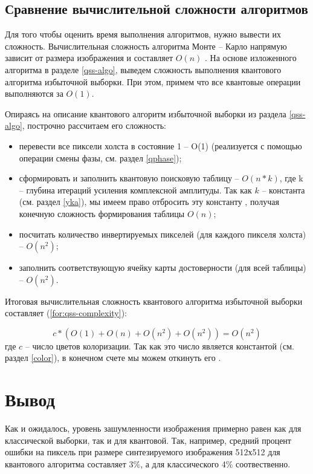 \subsection{Сравнение вычислительной сложности алгоритмов}

Для того чтобы оценить время выполнения алгоритмов, нужно вывести их сложность. Вычислительная сложность алгоритма Монте -- Карло напрямую зависит от размера изображения и составляет $O(n)$ \cite{mc-complexity}. На основе изложенного алгоритма в разделе \ref{qss-algo}, выведем сложность выполнения квантового алгоритма избыточной выборки. При этом, примем что все квантовые операции выполняются за $O(1)$. 

Опираясь на описание квантового алгоритм избыточной выборки из раздела \ref{qss-algo}, построчно рассчитаем его сложность:

\begin{itemize}
	\item перевести все пиксели холста в состояние 1 -- O(1) (реализуется с помощью операции смены фазы, см. раздел \ref{qphase});
	\item сформировать и заполнить квантовую поисковую таблицу -- $O(n * k)$, где k -- глубина итераций усиления комплексной амплитуды. Так как $k$ -- константа (см. раздел \ref{yka}), мы имеем право отбросить эту константу \cite{computation-complexity}, получая конечную сложность формирования таблицы $O(n)$;
	\item посчитать количество инвертируемых пикселей (для каждого пикселя холста) -- $O(n^2)$;
	\item заполнить соответствующую ячейку карты достоверности (для всей таблицы) -- $O(n^2)$.
\end{itemize}

Итоговая вычислительная сложность квантового алгоритма избыточной выборки составляет (\ref{for:qss-complexity}):

\begin{equation}
	\label{for:qss-complexity}
	c * (O(1) + O(n) + O(n^2) + O(n^2)) = O(n^2)
\end{equation}
где $c$ -- число цветов колоризации. Так как это число является константой (см. раздел \ref{color}), в конечном счете мы можем откинуть его \cite{computation-complexity}.

\section*{Вывод}

Как и ожидалось, уровень зашумленности изображения примерно равен как для классической выборки, так и для квантовой. Так, например, средний процент ошибки на пиксель при размере синтезируемого изображения 512х512 для квантового алгоритма составляет 3\%, а для классического 4\% соотвественно.

